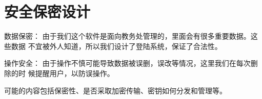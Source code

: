 \chapter{安全保密设计}
数据保密： 由于我们这个软件是面向教务处管理的，里面会有很多重要数据。这些数据 不宜被外人知道，所以我们设计了登陆系统，保证了合法性。

操作安全： 由于操作不慎可能导致数据被误删，误改等情况，这里我们在每次删除的时 候提醒用户，以防误操作。

可能的内容包括保密性、是否采取加密传输、密钥如何分发和管理等。
